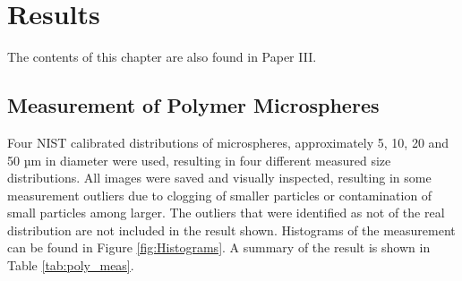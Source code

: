 
\chapter{Results}
\label{chap:results}

The contents of this chapter are also found in Paper III.

\section{Measurement of Polymer Microspheres}

Four NIST calibrated distributions of microspheres, approximately 5, 10, 20 and 50 µm in diameter were used, resulting in four different measured size distributions. All images were saved and visually inspected, resulting in some measurement outliers due to clogging of smaller particles or contamination of small particles among larger. The outliers that were identified as not of the real distribution are not included in the result shown. Histograms of the measurement can be found in Figure \ref{fig:Histograms}. A summary of the result is shown in Table \ref{tab:poly_meas}.

